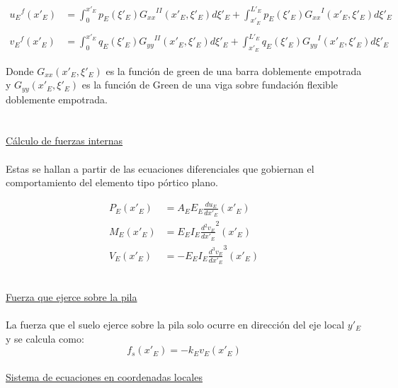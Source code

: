 \documentclass[a4paper]{article}
\begin{document}
\begin{subequation}
\begin{align}
    {u_E}^f(x'_E) & = \int_{0}^{x'_E} p_E({\xi}'_E){G_{xx}}^{II}(x'_E,{\xi}'_E) d{\xi}'_E +
    \int_{x'_E}^{L'_E} p_E({\xi}'_E){G_{xx}}^{I}(x'_E,{\xi}'_E) d{\xi}'_E \\
    \\
    {v_E}^f(x'_E) & = \int_{0}^{x'_E} q_E({\xi}'_E){G_{yy}}^{II}(x'_E,{\xi}'_E) d{\xi}'_E +
    \int_{x'_E}^{L'_E} q_E({\xi}'_E){G_{yy}}^{I}(x'_E,{\xi}'_E) d{\xi}'_E
\end{align}
\end{subequation}

Donde $G_{xx}(x'_E,{\xi}'_E)$ es la función de green de una barra doblemente empotrada y $G_{yy}(x'_E,{\xi}'_E)$ es la función de Green de una viga sobre fundación flexible doblemente empotrada.\\
\\
\\
\underline{Cálculo de fuerzas internas}\\
\\
Estas se hallan a partir de las ecuaciones diferenciales que gobiernan el comportamiento del elemento tipo pórtico plano. \\
\begin{subequation}
\begin{align}
    P_E(x'_E) & = A_E E_E \frac{du_E}{dx'_E}(x'_E)\\
    M_E(x'_E) & = E_E I_E \frac{d^2v_E}{dx'_E}^2(x'_E)\\
    V_E(x'_E) & = -E_E I_E \frac{d^3v_E}{dx'_E}^3(x'_E)
\end{align}
\end{subequation}
\\
\underline{Fuerza que ejerce sobre la pila}\\
\\
La fuerza que el suelo ejerce sobre la pila solo ocurre en dirección del eje local $y'_E$ y se calcula como:\\
\begin{equation}
    f_s(x'_E) = -k_E v_E(x'_E)
\end{equation}
\\
\underline{Sistema de ecuaciones en coordenadas locales}
\\ \\
\end{document}
